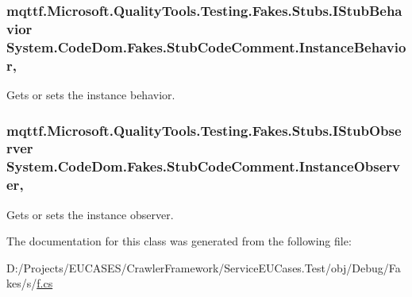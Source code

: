 \hypertarget{class_system_1_1_code_dom_1_1_fakes_1_1_stub_code_comment_a4cd80c20634875e0d599ec64d953a722}{
\subsubsection[{Instance\-Behavior}]{\setlength{\rightskip}{0pt plus 5cm}mqttf.\-Microsoft.\-Quality\-Tools.\-Testing.\-Fakes.\-Stubs.\-I\-Stub\-Behavior System.\-Code\-Dom.\-Fakes.\-Stub\-Code\-Comment.\-Instance\-Behavior\hspace{0.3cm}{\ttfamily [get]}, {\ttfamily [set]}}}\label{class_system_1_1_code_dom_1_1_fakes_1_1_stub_code_comment_a4cd80c20634875e0d599ec64d953a722}


Gets or sets the instance behavior.

\hypertarget{class_system_1_1_code_dom_1_1_fakes_1_1_stub_code_comment_a91c594023e3590ab2ef5c154aa3605ed}{
\subsubsection[{Instance\-Observer}]{\setlength{\rightskip}{0pt plus 5cm}mqttf.\-Microsoft.\-Quality\-Tools.\-Testing.\-Fakes.\-Stubs.\-I\-Stub\-Observer System.\-Code\-Dom.\-Fakes.\-Stub\-Code\-Comment.\-Instance\-Observer\hspace{0.3cm}{\ttfamily [get]}, {\ttfamily [set]}}}\label{class_system_1_1_code_dom_1_1_fakes_1_1_stub_code_comment_a91c594023e3590ab2ef5c154aa3605ed}


Gets or sets the instance observer.



The documentation for this class was generated from the following file\-:\begin{DoxyCompactItemize}
\item 
D\-:/\-Projects/\-E\-U\-C\-A\-S\-E\-S/\-Crawler\-Framework/\-Service\-E\-U\-Cases.\-Test/obj/\-Debug/\-Fakes/s/\hyperlink{s_2f_8cs}{f.\-cs}\end{DoxyCompactItemize}
